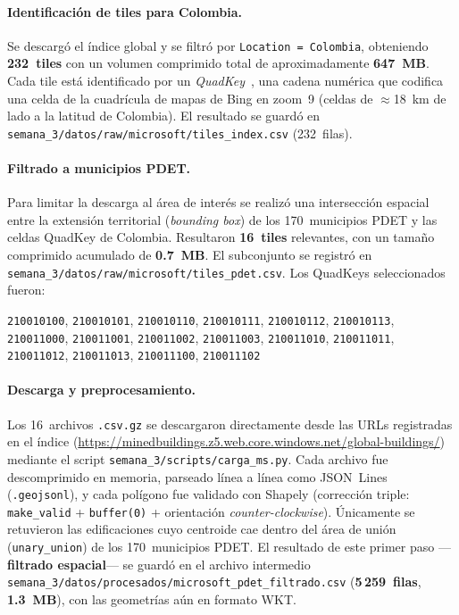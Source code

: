 \documentclass[12pt, a4paper]{report}
\begin{document}
\paragraph{Identificación de tiles para Colombia.}
Se descargó el índice global y se filtró por \texttt{Location = Colombia},
obteniendo \textbf{232~tiles} con un volumen comprimido total de
aproximadamente \textbf{647~MB}. Cada tile está identificado por un
\textit{QuadKey}~\cite{microsoft2023buildings}, una cadena numérica que
codifica una celda de la cuadrícula de mapas de Bing en zoom~9
(celdas de $\approx$18~km de lado a la latitud de Colombia).
El resultado se guardó en
\texttt{semana\_3/datos/raw/microsoft/tiles\_index.csv} (232~filas).

\paragraph{Filtrado a municipios PDET.}
Para limitar la descarga al área de interés se realizó una intersección
espacial entre la extensión territorial (\textit{bounding box}) de los
170~municipios PDET y las celdas QuadKey de Colombia.
Resultaron \textbf{16~tiles} relevantes, con un tamaño comprimido
acumulado de \textbf{0.7~MB}. El subconjunto se registró en
\texttt{semana\_3/datos/raw/microsoft/tiles\_pdet.csv}.
Los QuadKeys seleccionados fueron:

\begin{center}
\small
\texttt{210010100}, \texttt{210010101}, \texttt{210010110},
\texttt{210010111}, \texttt{210010112}, \texttt{210010113},
\texttt{210011000}, \texttt{210011001}, \texttt{210011002},
\texttt{210011003}, \texttt{210011010}, \texttt{210011011},
\texttt{210011012}, \texttt{210011013}, \texttt{210011100},
\texttt{210011102}
\end{center}

\paragraph{Descarga y preprocesamiento.}
Los 16~archivos \texttt{.csv.gz} se descargaron directamente desde las
URLs registradas en el índice
(\url{https://minedbuildings.z5.web.core.windows.net/global-buildings/})
mediante el script \texttt{semana\_3/scripts/carga\_ms.py}.
Cada archivo fue descomprimido en memoria, parseado línea a línea como
JSON~Lines (\texttt{.geojsonl}), y cada polígono fue validado con Shapely
(corrección triple: \texttt{make\_valid} + \texttt{buffer(0)} + orientación
\textit{counter-clockwise}).
Únicamente se retuvieron las edificaciones cuyo centroide cae dentro del
área de unión (\texttt{unary\_union}) de los 170~municipios PDET.
El resultado de este primer paso —\textbf{filtrado espacial}— se guardó
en el archivo intermedio
\texttt{semana\_3/datos/procesados/microsoft\_pdet\_filtrado.csv}
(\textbf{5\,259~filas}, \textbf{1.3~MB}), con las geometrías aún en
formato WKT.
\end{document}
